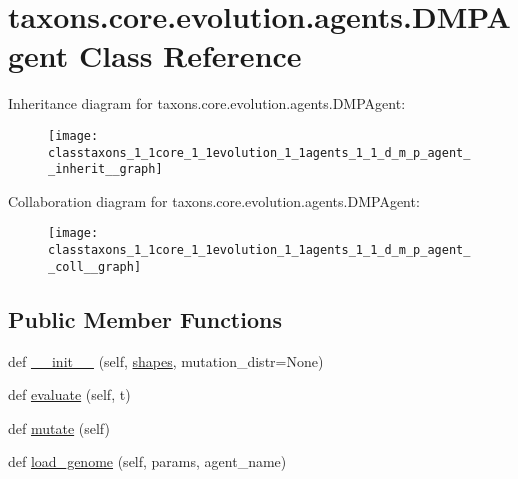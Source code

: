 \hypertarget{classtaxons_1_1core_1_1evolution_1_1agents_1_1_d_m_p_agent}{}\section{taxons.\+core.\+evolution.\+agents.\+D\+M\+P\+Agent Class Reference}
\label{classtaxons_1_1core_1_1evolution_1_1agents_1_1_d_m_p_agent}


Inheritance diagram for taxons.\+core.\+evolution.\+agents.\+D\+M\+P\+Agent\+:
\nopagebreak
\begin{figure}[H]
\begin{center}
\leavevmode
\texttt{[image: classtaxons\_1\_1core\_1\_1evolution\_1\_1agents\_1\_1\_d\_m\_p\_agent\_\_inherit\_\_graph]}
\end{center}
\end{figure}


Collaboration diagram for taxons.\+core.\+evolution.\+agents.\+D\+M\+P\+Agent\+:
\nopagebreak
\begin{figure}[H]
\begin{center}
\leavevmode
\texttt{[image: classtaxons\_1\_1core\_1\_1evolution\_1\_1agents\_1\_1\_d\_m\_p\_agent\_\_coll\_\_graph]}
\end{center}
\end{figure}
\subsection*{Public Member Functions}
\begin{DoxyCompactItemize}
\item 
def \hyperlink{classtaxons_1_1core_1_1evolution_1_1agents_1_1_d_m_p_agent_ade2b6a69de6bd516e095a3bb7359c0b4}{\+\_\+\+\_\+init\+\_\+\+\_\+} (self, \hyperlink{classtaxons_1_1core_1_1evolution_1_1agents_1_1_d_m_p_agent_a6b38224a5836d08108b8b3061a1f598d}{shapes}, mutation\+\_\+distr=None)
\item 
def \hyperlink{classtaxons_1_1core_1_1evolution_1_1agents_1_1_d_m_p_agent_ab588c8dad447ac7ac18cb8f23b3c7a09}{evaluate} (self, t)
\item 
def \hyperlink{classtaxons_1_1core_1_1evolution_1_1agents_1_1_d_m_p_agent_a83b3cef5f9c90f6654072dc3ff8c6067}{mutate} (self)
\item 
def \hyperlink{classtaxons_1_1core_1_1evolution_1_1agents_1_1_d_m_p_agent_a2ab31f24a7b467da7cbbebadc1dc7128}{load\+\_\+genome} (self, params, agent\+\_\+name)
\end{DoxyCompactItemize}
